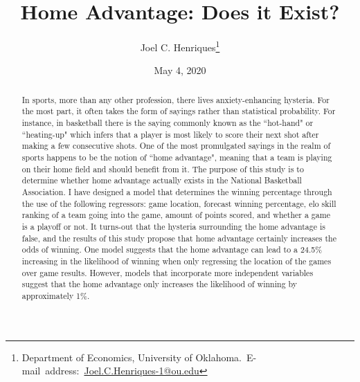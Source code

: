 \documentclass[12pt,english]{article}
\begin{document}
\begin{singlespace}
\title{Home Advantage: Does it Exist?}
\end{singlespace}

\author{Joel C. Henriques\thanks{Department of Economics, University of Oklahoma.\
E-mail~address:~\href{mailto:student.name@ou.edu}{Joel.C.Henriques-1@ou.edu}}}

\date{May 4, 2020}

\maketitle

\begin{abstract}
\begin{singlespace}
In sports, more than any other profession, there lives anxiety-enhancing hysteria. For the most part, it often takes the form of sayings rather than statistical probability. For instance, in basketball there is the saying commonly known as the “hot-hand" or “heating-up" which infers that a player is most likely to score their next shot after making a few consecutive shots. One of the most promulgated sayings in the realm of sports happens to be the notion of “home advantage", meaning that a team is playing on their home field and should benefit from it. The purpose of this study is to determine whether home advantage actually exists in the National Basketball Association. I have designed a model that determines the winning percentage through the use of the following regressors: game location, forecast winning percentage, elo skill ranking of a team going into the game, amount of points scored, and whether a game is a playoff or not. It turns-out that the hysteria surrounding the home advantage is false, and the results of this study propose that home advantage certainly increases the odds of winning. One model suggests that the home advantage can lead to a 24.5\% increasing in the likelihood of winning when only regressing the location of the games over game results. However, models that incorporate more independent variables suggest that the home advantage only increases the likelihood of winning by approximately 1\%. 
\end{singlespace}

\end{abstract}
\vfill{}


\pagebreak{}
\end{document}
